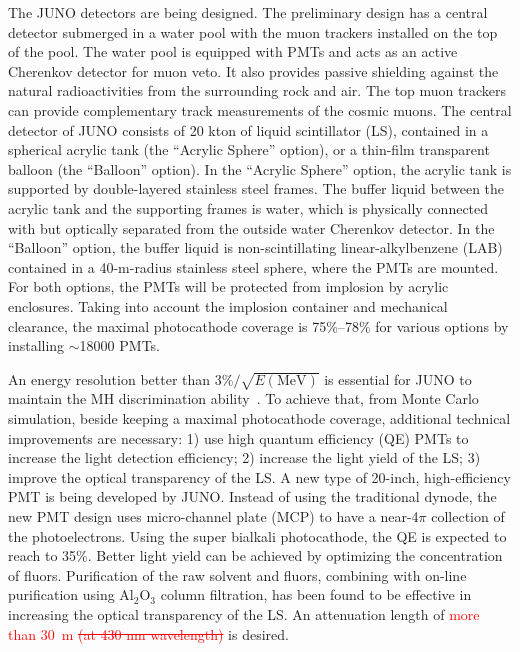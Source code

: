\documentclass[aps,twocolumn,preprintnumbers,amsmath,superscriptaddress,amssymb,floats,nofootinbib]{revtex4-1}
\begin{document}
The JUNO detectors are being designed. The preliminary design has a central detector submerged in a water pool with the muon trackers installed on the top of the pool. 
The water pool is equipped with PMTs and acts as an active Cherenkov detector for muon veto. 
It also provides passive shielding against the natural radioactivities from the surrounding rock and air. 
The top muon trackers can provide complementary track measurements of the cosmic muons. 
The central detector of JUNO consists of 20 kton of liquid scintillator (LS), contained in a spherical acrylic tank (the ``Acrylic Sphere'' option), or a thin-film transparent balloon (the ``Balloon'' option). 
In the ``Acrylic Sphere'' option, the acrylic tank is supported by double-layered stainless steel frames. 
The buffer liquid between the acrylic tank and the supporting frames is water, which is physically connected with but optically separated from the outside water Cherenkov detector. 
In the ``Balloon'' option, the buffer liquid is non-scintillating linear-alkylbenzene (LAB) contained in a 40-m-radius stainless steel sphere, where the PMTs are mounted. 
For both options, the PMTs will be protected from implosion by acrylic enclosures. 
Taking into account the implosion container and mechanical clearance, the maximal photocathode coverage is 75\%--78\% for various options by installing $\sim$18000 PMTs.

An energy resolution better than $3\%/\sqrt{E(\textrm{MeV})}$ is essential for JUNO to maintain the MH discrimination ability~\cite{Li-PRD13}. 
To achieve that, from Monte Carlo simulation, beside keeping a maximal photocathode coverage, additional technical improvements are necessary: 
1) use high quantum efficiency (QE) PMTs to increase the light detection efficiency;
2) increase the light yield of the LS;
3) improve the optical transparency of the LS.
A new type of 20-inch, high-efficiency PMT is being developed by JUNO. Instead of using the traditional dynode, the new PMT design uses micro-channel plate (MCP) to have a near-4$\pi$ collection of the photoelectrons. 
Using the super bialkali photocathode, the QE is expected to reach to 35\%. 
Better light yield can be achieved by optimizing the concentration of fluors. 
Purification of the raw solvent and fluors, combining with on-line purification using Al$_2$O$_3$ column filtration, has been found to be effective in increasing the optical transparency of the LS. An attenuation length of \textcolor{red}{more than 30~m \st{(at 430 nm wavelength)}} is desired.
\end{document}
